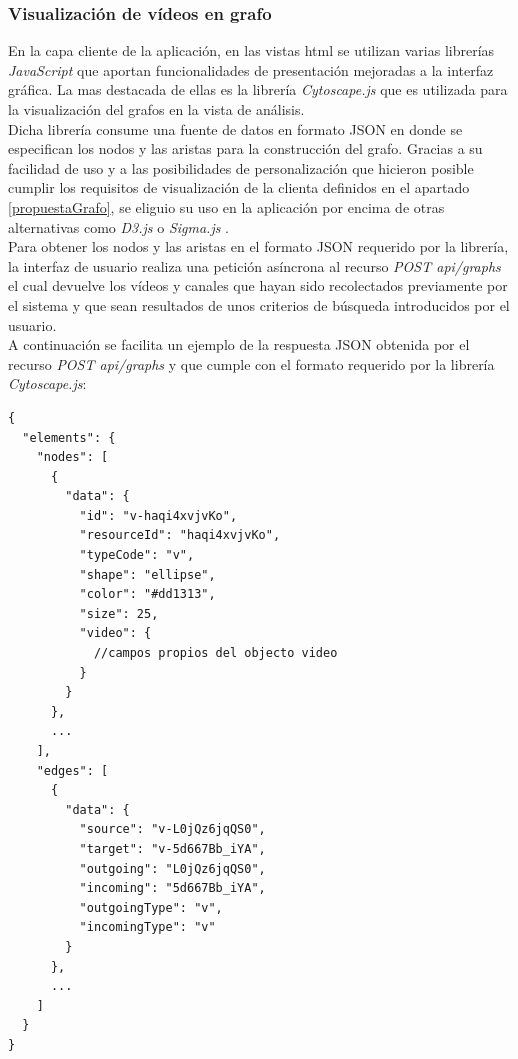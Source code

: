 \documentclass[11pt,a4paper]{article}
\begin{document}
\subsubsection{Visualización de vídeos en grafo}
En la capa cliente de la aplicación, en las vistas html se utilizan varias librerías \textit{JavaScript} que aportan funcionalidades de presentación mejoradas a la interfaz gráfica. La mas destacada de ellas es la librería \textit{Cytoscape.js} \cite{51} que es utilizada para la visualización del grafos en la vista de análisis.
\\

Dicha librería consume una fuente de datos en formato JSON en donde se especifican los nodos y las aristas para la construcción del grafo. Gracias a su facilidad de uso y a las posibilidades de personalización que hicieron posible cumplir los requisitos de visualización de la clienta definidos en el apartado \ref{propuestaGrafo}, se eliguio su uso en la aplicación por encima de otras alternativas como \textit{D3.js} \cite{52} o \textit{Sigma.js} \cite{53}.
\\

Para obtener los nodos y las aristas en el formato JSON requerido por la librería, la interfaz de usuario realiza una petición asíncrona al recurso \textit{POST api/graphs} el cual devuelve los vídeos y canales que hayan sido recolectados previamente por el sistema y que sean resultados de unos criterios de búsqueda introducidos por el usuario.
\\

A continuación se facilita un ejemplo de la respuesta JSON obtenida por el recurso \textit{POST api/graphs} y que cumple con el formato requerido por la librería \textit{Cytoscape.js}:
\begin{lstlisting}[style=C]
{
  "elements": {
    "nodes": [
      {
        "data": {
          "id": "v-haqi4xvjvKo",
          "resourceId": "haqi4xvjvKo",
          "typeCode": "v",
          "shape": "ellipse",
          "color": "#dd1313",
          "size": 25,
          "video": {
            //campos propios del objecto video
          }
        }
      },
      ...
    ],
    "edges": [
      {
        "data": {
          "source": "v-L0jQz6jqQS0",
          "target": "v-5d667Bb_iYA",
          "outgoing": "L0jQz6jqQS0",
          "incoming": "5d667Bb_iYA",
          "outgoingType": "v",
          "incomingType": "v"
        }
      },
      ...
    ]
  }
}
\end{lstlisting}
\end{document}
